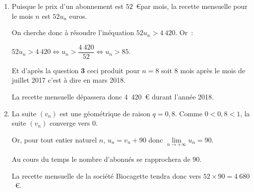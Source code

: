 \begin{corrige}
\begin{enumerate}
\begin{enumerate}[label=\alph*.]
               \item
               \par
               Puisque le prix d'un abonnement est  $52$~\euro par mois, la recette mensuelle pour le mois $n$ est $52 u_n$ euros.
               \par
               On cherche donc à résoudre l'inéquation $52 u_n > 4~420$. Or~:
               \par
               $52 u_n > 4~420 \Leftrightarrow u_n > \dfrac{4~420}{52} \Leftrightarrow u_n > 85$.
               \par
               Et d'après la question \textbf{3} ceci produit pour $n=8$ soit 8 mois après le mois de juillet 2017 c'est à dire en mars 2018.
               \par
               La recette mensuelle dépassera donc 4~420~\euro{} durant l'année 2018.
               \item
               La suite $(v_n)$ est une géométrique de raison $q=0,8$. Comme $0<0,8<1$, la suite $(v_n)$ converge vers 0.
               \par
               Or, pour tout entier naturel $n$, $u_n=v_n+90$ donc  $\lim\limits_{n \rightarrow +\infty}u_n=90$.
               \par
               Au cours du temps le nombre d'abonnés se rapprochera de $90$.
               \par
               La recette mensuelle  de la société Biocagette tendra donc vers $52 \times 90= 4~680$~\euro.
          \end{enumerate}
     \end{enumerate}
\end{corrige}
